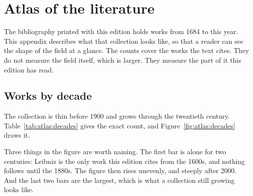 \chapter{Atlas of the literature}\label{app:atlas}
%

The bibliography printed with this edition holds works from 1684 to this year. %
This appendix describes what that collection looks like, so that a reader can %
see the shape of the field at a glance. %
The counts cover the works the text cites. %
They do not measure the field itself, which is larger. %
They measure the part of it this edition has read. %

\section{Works by decade}

The collection is thin before 1900 and grows through the twentieth century. %
Table~\ref{tab:atlas:decades} gives the exact count, and %
Figure~\ref{fig:atlas:decades} draws it. %


Three things in the figure are worth naming. The first bar is alone for two %
centuries: Leibniz is the only work this edition cites from the 1600s, and %
nothing follows until the 1880s. The figure then rises unevenly, and steeply %
after 2000. And the last two bars are the largest, which is what a collection %
still growing looks like. %

